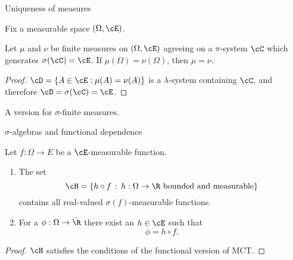 \begin{frame}
    {Uniqueness of measures}

    Fix a measurable space $\left( \Omega, \cE \right)$. 

    \begin{theorem}
        Let $\mu$ and $\nu$ be finite measures on $(\Omega, \cE)$ agreeing 
        on a $\pi$-system $\cC$ which generates $\sigma(\cC)=\cE$. If $\mu(\Omega)=\nu(\Omega)$, then
        $\mu=\nu$.
    \end{theorem}
    \begin{proof}
        $\cD = \left\{ A \in \cE : \mu(A)=\nu(A) \right\}$
        is a $\lambda$-system containing $\cC$, and therefore $\cD=\sigma(\cC)=\cE$.
    \end{proof}

    A version for $\sigma$-finite measures.

\end{frame}



\begin{frame}
    {$\sigma$-algebras and functional dependence}
    
    \begin{theorem}
        Let $f: \Omega \to E$ be a $\cE$-measurable function. 
        \begin{enumerate}
            \item The set  
                \begin{equation*}
                    \cH = \left\{ h \circ f \,:\, h:\Omega\to\R \text{ bounded and measurable} \right\}
                \end{equation*}
                contains all real-valued $\sigma(f)$-measurable functions. 
            \item For a $\phi: \Omega\to \bar\R$ there exist an $h\in\cE$ such that
                \begin{equation*}
                    \phi = h\circ f.
                \end{equation*}
        \end{enumerate}
    \end{theorem}

    \begin{proof}
        $\cH$ satisfies the conditions of the functional version of MCT. 
    \end{proof}

\end{frame}


